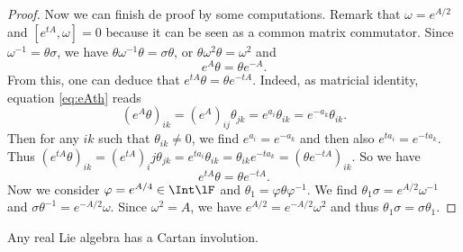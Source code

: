 \begin{proof}
Now we can finish de proof by some computations. Remark that $\omega=e^{A/2}$ and $[e^{tA},\omega]=0$ because it can be seen as a common matrix commutator. Since $\omega^{-1}=\theta\sigma$, we have $\theta\omega^{-1}\theta=\sigma\theta$, or $\theta\omega^2\theta=\omega^2$ and
\begin{equation}\label{eq:eAth}
   e^{A}\theta=\theta e^{-A}.
\end{equation}
From this, one can deduce that $e^{tA}\theta=\theta e^{-tA}$. Indeed, as matricial identity, equation \eqref{eq:eAth} reads
\[
    (e^{A}\theta)_{ik}=(e^{A})_{ij}\theta_{jk}
                      =e^{a_i}\theta_{ik}
              =e^{-a_k}\theta_{ik}.
\]
Then for any $ik$ such that $\theta_{ik}\neq 0$, we find $e^{a_i}=e^{-a_k}$ and then also $e^{ta_i}=e^{-ta_k}$. Thus $(e^{tA}\theta)_{ik}=(e^{tA})_ij\theta_{jk}=e^{ta_i}\theta_{ik}=\theta_{ik}e^{-ta_k}=(\theta e^{-tA})_{ik}$. So we have
\begin{equation}
  e^{tA}\theta=\theta e^{-tA}.
\end{equation}
Now we consider $\varphi=e^{A/4}\in\Int\lF$ and $\theta_1=\varphi\theta\varphi^{-1}$. We find $\theta_1\sigma=e^{A/2}\omega^{-1}$ and $\sigma\theta^{-1}=e^{-A/2}\omega$. Since $\omega^2=A$, we have $e^{A/2}=e^{-A/2}\omega^2$ and thus $\theta_1\sigma=\sigma\theta_1$.

\end{proof}

\begin{corollary}
Any real Lie algebra has a Cartan involution.
\end{corollary}

